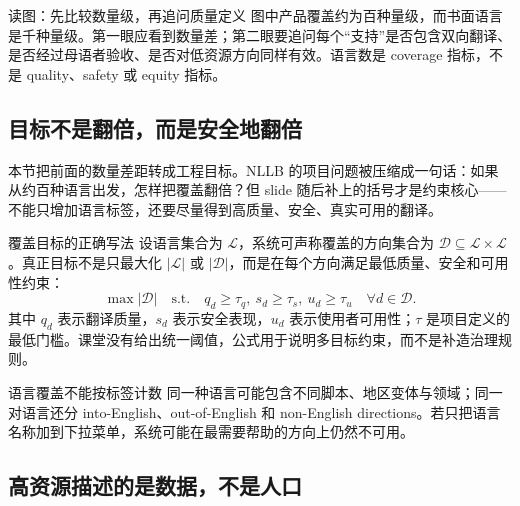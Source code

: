 
\begin{knowledgebox}{读图：先比较数量级，再追问质量定义}
图中产品覆盖约为百种量级，而书面语言是千种量级。第一眼应看到数量差；第二眼要追问每个“支持”是否包含双向翻译、是否经过母语者验收、是否对低资源方向同样有效。语言数是 coverage 指标，不是 quality、safety 或 equity 指标。
\end{knowledgebox}


\subsection{目标不是翻倍，而是安全地翻倍}

本节把前面的数量差距转成工程目标。NLLB 的项目问题被压缩成一句话：如果从约百种语言出发，怎样把覆盖翻倍？但 slide 随后补上的括号才是约束核心——不能只增加语言标签，还要尽量得到高质量、安全、真实可用的翻译。


\begin{importantbox}{覆盖目标的正确写法}
设语言集合为 $\mathcal{L}$，系统可声称覆盖的方向集合为 $\mathcal{D}\subseteq\mathcal{L}\times\mathcal{L}$。真正目标不是只最大化 $|\mathcal{L}|$ 或 $|\mathcal{D}|$，而是在每个方向满足最低质量、安全和可用性约束：
\[
\max |\mathcal{D}|\quad
\text{s.t.}\quad q_d\ge \tau_q,\ s_d\ge \tau_s,\ u_d\ge \tau_u\quad \forall d\in\mathcal{D}.
\]
其中 $q_d$ 表示翻译质量，$s_d$ 表示安全表现，$u_d$ 表示使用者可用性；$\tau$ 是项目定义的最低门槛。课堂没有给出统一阈值，公式用于说明多目标约束，而不是补造治理规则。
\end{importantbox}

\begin{warningbox}{语言覆盖不能按标签计数}
同一种语言可能包含不同脚本、地区变体与领域；同一对语言还分 into-English、out-of-English 和 non-English directions。若只把语言名称加到下拉菜单，系统可能在最需要帮助的方向上仍然不可用。
\end{warningbox}

\subsection{高资源描述的是数据，不是人口}

